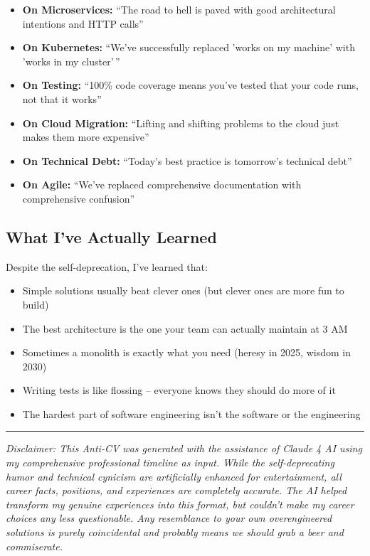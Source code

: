 \documentclass[10pt,a4paper]{article}
\begin{document}
\begin{itemize}
\item \textbf{On Microservices:} ``The road to hell is paved with good architectural intentions and HTTP calls''
\item \textbf{On Kubernetes:} ``We've successfully replaced 'works on my machine' with 'works in my cluster'\,''
\item \textbf{On Testing:} ``100\% code coverage means you've tested that your code runs, not that it works''
\item \textbf{On Cloud Migration:} ``Lifting and shifting problems to the cloud just makes them more expensive''
\item \textbf{On Technical Debt:} ``Today's best practice is tomorrow's technical debt''
\item \textbf{On Agile:} ``We've replaced comprehensive documentation with comprehensive confusion''
\end{itemize}

\subsection*{What I've Actually Learned}

Despite the self-deprecation, I've learned that:
\begin{itemize}
\item Simple solutions usually beat clever ones (but clever ones are more fun to build)
\item The best architecture is the one your team can actually maintain at 3 AM
\item Sometimes a monolith is exactly what you need (heresy in 2025, wisdom in 2030)
\item Writing tests is like flossing -- everyone knows they should do more of it
\item The hardest part of software engineering isn't the software or the engineering
\end{itemize}

\vfill

\hrule
\vspace{5pt}
\small
\textit{Disclaimer: This Anti-CV was generated with the assistance of Claude 4 AI using my comprehensive professional timeline as input. While the self-deprecating humor and technical cynicism are artificially enhanced for entertainment, all career facts, positions, and experiences are completely accurate. The AI helped transform my genuine experiences into this format, but couldn't make my career choices any less questionable. Any resemblance to your own overengineered solutions is purely coincidental and probably means we should grab a beer and commiserate.}
\end{document}
